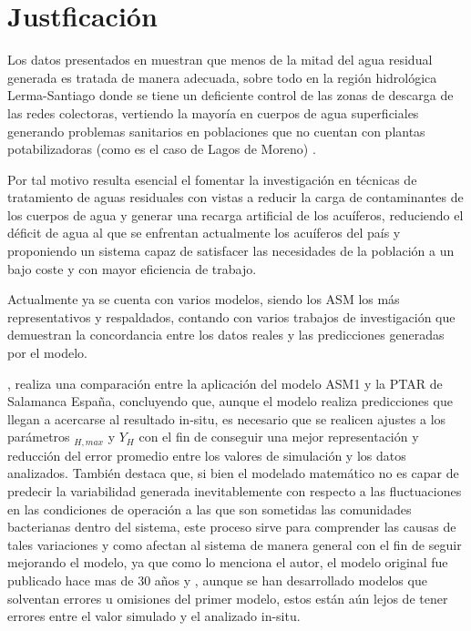 \section{Justficación}
Los datos presentados en \cite{ODS23} muestran que menos de la mitad del agua residual generada es tratada de manera adecuada, sobre todo en la región hidrológica Lerma-Santiago donde se tiene un deficiente control de las zonas de descarga de las redes colectoras, vertiendo la mayoría en cuerpos de agua superficiales generando problemas sanitarios en poblaciones que no cuentan con plantas potabilizadoras (como es el caso de Lagos de Moreno) \citep{CEAJ2015}.\par
Por tal motivo resulta esencial el fomentar la investigación en técnicas de tratamiento de aguas residuales con vistas a reducir la carga de contaminantes de los cuerpos de agua y generar una recarga artificial de los acuíferos, reduciendo el déficit de agua al que se enfrentan actualmente los acuíferos del país y proponiendo un sistema capaz de satisfacer las necesidades de la población a un bajo coste y con mayor eficiencia de trabajo.\par
Actualmente ya se cuenta con varios modelos, siendo los \gls{ASM} los más representativos y respaldados, contando con varios trabajos de investigación que demuestran la concordancia entre los datos reales y las predicciones generadas por el modelo.\par
\cite{Costa2022}, realiza una comparación entre la aplicación del modelo \acrshort{ASM}1 y la \acrshort{PTAR} de Salamanca España, concluyendo que, aunque el modelo realiza predicciones que llegan a acercarse al resultado in-situ, es necesario que se realicen ajustes a los parámetros \textit{}$_{H,max}$ y $Y_{H}$ con el fin de conseguir una mejor representación y reducción del error promedio entre los valores de simulación y los datos analizados. También destaca que, si bien el modelado matemático no es capar de predecir la variabilidad generada inevitablemente con respecto a las fluctuaciones en las condiciones de operación a las que son sometidas las comunidades bacterianas dentro del sistema, este proceso sirve para comprender las causas de tales variaciones y como afectan al sistema de manera general con el fin de seguir mejorando el modelo, ya que como lo menciona el autor, el modelo original fue publicado hace mas de 30 años y , aunque se han desarrollado modelos que solventan errores u omisiones del primer modelo, estos están aún lejos de tener errores entre el valor simulado y el analizado in-situ.\par
